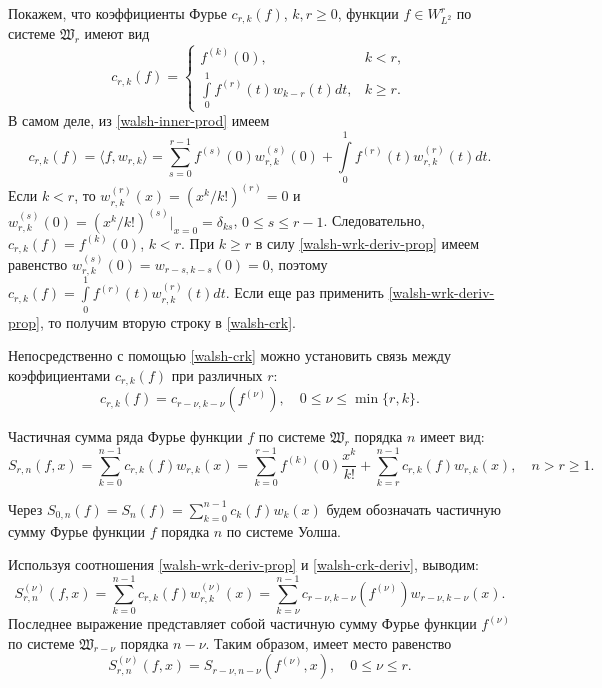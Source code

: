 Покажем, что коэффициенты Фурье $c_{r,k}(f)$, $k, r \ge 0$, функции $f \in W^r_{L^2}$ по системе $\mathfrak{W}_r$ имеют вид
\begin{equation}\label{walsh-crk}
c_{r,k}(f)=
\begin{cases}
f^{(k)}(0), &k<r,\\
\int\limits_{0}^{1}f^{(r)}(t)w_{k-r}(t)dt, &k \ge r.
\end{cases}
\end{equation}
В самом деле, из \eqref{walsh-inner-prod} имеем
\begin{equation*}
c_{r,k}(f)=\langle f, w_{r,k} \rangle =
\sum\limits_{s=0}^{r-1}f^{(s)}(0)w^{(s)}_{r,k}(0)+\int\limits_{0}^{1}f^{(r)}(t)w^{(r)}_{r,k}(t)dt.
\end{equation*}
Если $k < r$, то $w^{(r)}_{r,k}(x)=(x^k/k!)^{(r)}=0$ и $w^{(s)}_{r,k}(0)=(x^k/k!)^{(s)}\big|_{x=0}=\delta_{ks}$, $0 \le s \le r-1$. Следовательно, $c_{r,k}(f)=f^{(k)}(0)$, $k < r$. При $k \ge r$ в силу \eqref{walsh-wrk-deriv-prop} имеем равенство $w^{(s)}_{r,k}(0)=w_{r-s,k-s}(0)=0$, поэтому $c_{r,k}(f)=\int\limits_{0}^{1}f^{(r)}(t)w^{(r)}_{r,k}(t)dt$. Если еще раз применить \eqref{walsh-wrk-deriv-prop}, то получим вторую строку в \eqref{walsh-crk}.

Непосредственно с помощью \eqref{walsh-crk} можно установить связь между коэффициентами $c_{r,k}(f)$ при различных $r$:
\begin{equation}\label{walsh-crk-deriv}
c_{r,k}(f)=c_{r-\nu,k-\nu}(f^{(\nu)}), \quad 0 \le \nu \le \min\{r,k\}.
\end{equation}

Частичная сумма ряда Фурье функции $f$ по системе $\mathfrak{W}_r$ порядка $n$ имеет вид:
\begin{equation*}
S_{r,n}(f,x)=
\sum_{k=0}^{n-1}c_{r,k}(f)w_{r,k}(x)=
\sum_{k=0}^{r-1}f^{(k)}(0)\frac{x^k}{k!}+
\sum_{k=r}^{n-1}c_{r,k}(f)w_{r,k}(x), \quad n > r \ge 1.
\end{equation*}

Через $S_{0,n}(f)=S_n(f)=\sum\limits_{k=0}^{n-1}c_k(f)w_k(x)$ будем обозначать частичную сумму Фурье функции $f$ порядка $n$ по системе Уолша.

Используя соотношения \eqref{walsh-wrk-deriv-prop} и \eqref{walsh-crk-deriv}, выводим:
\begin{equation*}
S_{r,n}^{(\nu)}(f,x)=
\sum_{k=0}^{n-1}c_{r,k}(f)w^{(\nu)}_{r,k}(x)=
\sum_{k=\nu}^{n-1}c_{r-\nu,k-\nu}(f^{(\nu)})w_{r-\nu,k-\nu}(x).
\end{equation*}
Последнее выражение представляет собой частичную сумму Фурье функции $f^{(\nu)}$ по системе $\mathfrak{W}_{r-\nu}$ порядка $n-\nu$. Таким образом, имеет место равенство
\begin{equation}\label{walsh-Srn-deriv}
S_{r,n}^{(\nu)}(f,x)=
S_{r-\nu,n-\nu}(f^{(\nu)},x), \quad 0 \le \nu \le r.
\end{equation}

